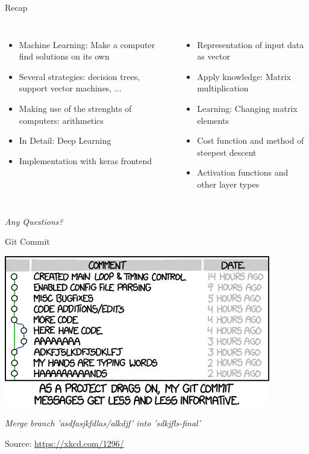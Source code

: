 
\begin{frame}[t,plain]
\titlepage
\end{frame}


\begin{frame}{Recap}
%
\begin{columns}[T]
\begin{itemize}
\item Machine Learning: Make a computer find solutions on its own
\item Several strategies: decision trees, support vector machines, ...
\item Making use of the strenghts of computers: arithmetics
\item In Detail: Deep Learning
\item Implementation with keras frontend
\end{itemize}
%
\begin{itemize}
\item Representation of input data as vector
\item Apply knowledge: Matrix multiplication
\item Learning: Changing matrix elements
\item Cost function and method of steepest descent
\item Activation functions and other layer types
\end{itemize}
%
\end{columns}
%
\begin{center}
	\emph{Any Questions?}
\end{center}
%
\end{frame}


\begin{frame}{Git Commit}
%
\begin{center}
	\includegraphics[width=.5\linewidth]{./gfx/xkcd-gitcommit}
	
	\vspace{12pt}
	\emph{Merge branch 'asdfasjkfdlas/alkdjf' into 'sdkjfls-final'}
	
	Source: \url{https://xkcd.com/1296/}
\end{center}
%
\end{frame}

